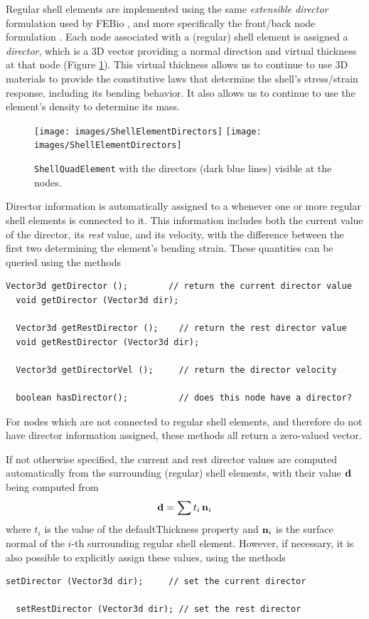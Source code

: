 Regular shell elements are implemented using the same {\it
extensible director} formulation used by FEBio \cite{MaasFEBio2012},
and more specifically the front/back node formulation
\cite{FEBioTheory2018}.  Each node associated with a (regular)
shell element is assigned a {\it director}, which is a 3D vector
providing a normal direction and virtual thickness at that node
(Figure \ref{ShellElementDirectors:fig}). This virtual thickness
allows us to continue to use 3D materials to provide
the constitutive laws that determine the
shell's stress/strain response, including its bending behavior. It
also allows us to continue to use the element's {\sf density} to
determine its mass.

\begin{figure}[ht]
\begin{center}
\iflatexml
 \texttt{[image: images/ShellElementDirectors]}
\else
 \texttt{[image: images/ShellElementDirectors]}
\fi
\end{center}
\caption{{\tt ShellQuadElement} with the directors (dark blue lines)
visible at the nodes.}
\label{ShellElementDirectors:fig}
\end{figure}

Director information is automatically assigned to a
 whenever one or more
regular shell elements is connected to it. This information includes both the
current value of the director, its {\it rest} value, and its velocity,
with the difference between the first two determining the element's
bending strain.  These quantities can be queried using the methods
%
\begin{lstlisting}[]
  Vector3d getDirector ();        // return the current director value
  void getDirector (Vector3d dir);

  Vector3d getRestDirector ();    // return the rest director value
  void getRestDirector (Vector3d dir);

  Vector3d getDirectorVel ();     // return the director velocity

  boolean hasDirector();          // does this node have a director?
\end{lstlisting}
%
For nodes which are not connected to regular shell elements, and
therefore do not have director information assigned, these methods all
return a zero-valued vector.

If not otherwise specified, the current and rest director values are
computed automatically from the surrounding (regular) shell elements,
with their value ${\bf d}$ being computed from
%
\begin{equation*}
{\bf d} = \sum t_i \, {\bf n}_i
\end{equation*}
%
where $t_i$ is the value of the {\sf defaultThickness} property and
${\bf n}_i$ is the surface normal of the $i$-th surrounding regular shell
element.
However, if necessary, it is also possible to explicitly assign
these values, using the methods
%
\begin{lstlisting}[]
  setDirector (Vector3d dir);     // set the current director

  setRestDirector (Vector3d dir); // set the rest director
\end{lstlisting}
%


